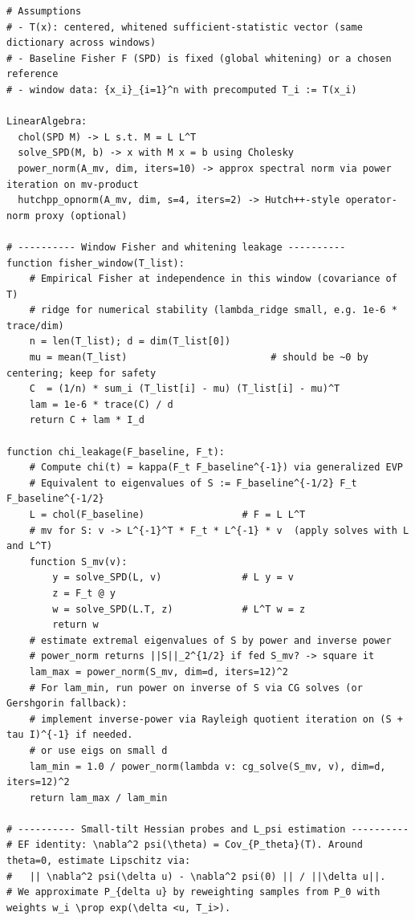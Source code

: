 \documentclass[10pt]{article}
\begin{document}
\begin{lstlisting}
# Assumptions
# - T(x): centered, whitened sufficient-statistic vector (same dictionary across windows)
# - Baseline Fisher F (SPD) is fixed (global whitening) or a chosen reference
# - window data: {x_i}_{i=1}^n with precomputed T_i := T(x_i)

LinearAlgebra:
  chol(SPD M) -> L s.t. M = L L^T
  solve_SPD(M, b) -> x with M x = b using Cholesky
  power_norm(A_mv, dim, iters=10) -> approx spectral norm via power iteration on mv-product
  hutchpp_opnorm(A_mv, dim, s=4, iters=2) -> Hutch++-style operator-norm proxy (optional)

# ---------- Window Fisher and whitening leakage ----------
function fisher_window(T_list):
    # Empirical Fisher at independence in this window (covariance of T)
    # ridge for numerical stability (lambda_ridge small, e.g. 1e-6 * trace/dim)
    n = len(T_list); d = dim(T_list[0])
    mu = mean(T_list)                         # should be ~0 by centering; keep for safety
    C  = (1/n) * sum_i (T_list[i] - mu) (T_list[i] - mu)^T
    lam = 1e-6 * trace(C) / d
    return C + lam * I_d

function chi_leakage(F_baseline, F_t):
    # Compute chi(t) = kappa(F_t F_baseline^{-1}) via generalized EVP
    # Equivalent to eigenvalues of S := F_baseline^{-1/2} F_t F_baseline^{-1/2}
    L = chol(F_baseline)                 # F = L L^T
    # mv for S: v -> L^{-1}^T * F_t * L^{-1} * v  (apply solves with L and L^T)
    function S_mv(v):
        y = solve_SPD(L, v)              # L y = v
        z = F_t @ y
        w = solve_SPD(L.T, z)            # L^T w = z
        return w
    # estimate extremal eigenvalues of S by power and inverse power
    # power_norm returns ||S||_2^{1/2} if fed S_mv? -> square it
    lam_max = power_norm(S_mv, dim=d, iters=12)^2
    # For lam_min, run power on inverse of S via CG solves (or Gershgorin fallback):
    # implement inverse-power via Rayleigh quotient iteration on (S + tau I)^{-1} if needed.
    # or use eigs on small d
    lam_min = 1.0 / power_norm(lambda v: cg_solve(S_mv, v), dim=d, iters=12)^2 
    return lam_max / lam_min

# ---------- Small-tilt Hessian probes and L_psi estimation ----------
# EF identity: \nabla^2 psi(\theta) = Cov_{P_theta}(T). Around theta=0, estimate Lipschitz via:
#   || \nabla^2 psi(\delta u) - \nabla^2 psi(0) || / ||\delta u||.
# We approximate P_{delta u} by reweighting samples from P_0 with weights w_i \prop exp(\delta <u, T_i>).


\end{lstlisting}
\end{document}
